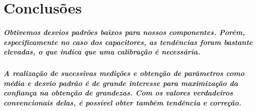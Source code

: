 \documentclass[12pt,twoside, a4paper, twocolumn]{article}
\begin{document}
\section{Conclusões}

\subparagraph*{Obtivemos desvios padrões baixos para nossos componentes. Porém, especificamente no caso dos capacitores, as tendências foram bastante elevadas, o que indica que uma calibração é necessária.}

\subparagraph*{A realização de sucessivas medições e obtenção de parâmetros como média e desvio padrão é de grande interesse para maximização da confiança na obtenção de grandezas. Com os valores verdadeiros convencionais delas, é possível obter também tendência e correção.}
\end{document}
